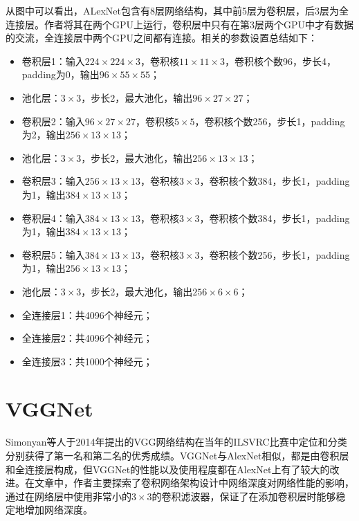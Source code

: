 从图中可以看出，ALexNet包含有8层网络结构，其中前5层为卷积层，后3层为全连接层。作者将其在两个GPU上运行，卷积层中只有在第3层两个GPU中才有数据的交流，全连接层中两个GPU之间都有连接。相关的参数设置总结如下：
\begin{itemize}
	\item 卷积层1：输入$224\times224\times3$，卷积核$11\times11\times3$，卷积核个数96，步长4，padding为0，输出$96\times55\times55$；
	\item 池化层：$3\times3$，步长2，最大池化，输出$96\times27\times27$；
	\item 卷积层2：输入$96\times27\times27$，卷积核$5\times5$，卷积核个数256，步长1，padding为2，输出$256\times13\times13$；
	\item 池化层：$3\times3$，步长2，最大池化，输出$256\times13\times13$；
	\item 卷积层3：输入$256\times13\times13$，卷积核$3\times3$，卷积核个数384，步长1，padding为1，输出$384\times13\times13$；
	\item 卷积层4：输入$384\times13\times13$，卷积核$3\times3$，卷积核个数384，步长1，padding为1，输出$384\times13\times13$；
	\item 卷积层5：输入$384\times13\times13$，卷积核$3\times3$，卷积核个数256，步长1，padding为1，输出$256\times13\times13$；
	\item 池化层：$3\times3$，步长2，最大池化，输出$256\times6\times6$；
	\item 全连接层1：共4096个神经元；
	\item 全连接层2：共4096个神经元；
	\item 全连接层3：共1000个神经元；
\end{itemize}

\section{VGGNet}

Simonyan等人\cite{simonyan2014very}于2014年提出的VGG网络结构在当年的ILSVRC比赛中定位和分类分别获得了第一名和第二名的优秀成绩。VGGNet与AlexNet相似，都是由卷积层和全连接层构成，但VGGNet的性能以及使用程度都在AlexNet上有了较大的改进。在文章中，作者主要探索了卷积网络架构设计中网络深度对网络性能的影响，通过在网络层中使用非常小的$3\times3$的卷积滤波器，保证了在添加卷积层时能够稳定地增加网络深度。

